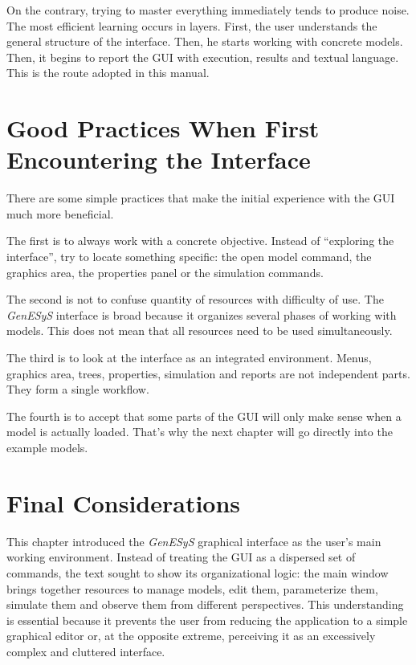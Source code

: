 On the contrary, trying to master everything immediately tends to produce noise. The most efficient learning occurs in layers. First, the user understands the general structure of the interface. Then, he starts working with concrete models. Then, it begins to report the GUI with execution, results and textual language. This is the route adopted in this manual.

\section{Good Practices When First Encountering the Interface}
\label{sec:cap3_boas_praticas_primeiro_contato}

There are some simple practices that make the initial experience with the GUI much more beneficial.

The first is to always work with a concrete objective. Instead of ``exploring the interface'', try to locate something specific: the open model command, the graphics area, the properties panel or the simulation commands.

The second is not to confuse quantity of resources with difficulty of use. The \textit{GenESyS} interface is broad because it organizes several phases of working with models. This does not mean that all resources need to be used simultaneously.

The third is to look at the interface as an integrated environment. Menus, graphics area, trees, properties, simulation and reports are not independent parts. They form a single workflow.

The fourth is to accept that some parts of the GUI will only make sense when a model is actually loaded. That's why the next chapter will go directly into the example models.

\section{Final Considerations}
\label{sec:cap3_consideracoes_finais}

This chapter introduced the \textit{GenESyS} graphical interface as the user's main working environment. Instead of treating the GUI as a dispersed set of commands, the text sought to show its organizational logic: the main window brings together resources to manage models, edit them, parameterize them, simulate them and observe them from different perspectives. This understanding is essential because it prevents the user from reducing the application to a simple graphical editor or, at the opposite extreme, perceiving it as an excessively complex and cluttered interface.

